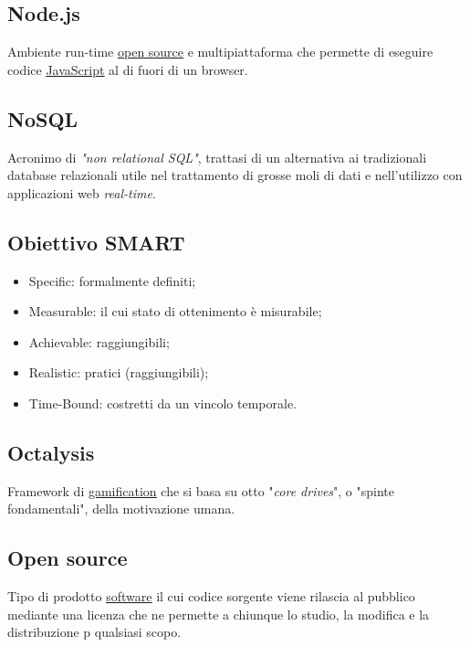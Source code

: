 	\subsection{Node.js}
	\label{sec:nodejs}
	Ambiente run-time \underline{\hyperref[sec:opensource]{open source}} e multipiattaforma che permette di eseguire codice \underline{\hyperref[sec:javascript]{JavaScript}} al di fuori di un browser.

	\subsection{NoSQL}
	\label{sec:nosql}
	Acronimo di \emph{"non relational SQL"}, trattasi di un alternativa ai tradizionali database relazionali utile nel trattamento di grosse moli di dati e nell'utilizzo con applicazioni web \emph{real-time}.
	\newpage


	\subsection{Obiettivo SMART}
	\label{sec:smart}
	\begin{itemize}
			\item Specific: formalmente definiti;
			\item Measurable: il cui stato di ottenimento è misurabile;
			\item Achievable: raggiungibili;
			\item Realistic: pratici (raggiungibili);
			\item Time-Bound: costretti da un vincolo temporale.
		\end{itemize}

	\subsection{Octalysis}
	\label{sec:octalysis}
	Framework di \underline{\hyperref[sec:gamification]{gamification}} che si basa su otto "\emph{core drives}", o "spinte fondamentali", della motivazione umana.

		\subsection{Open source}
		\label{sec:opensource}
		Tipo di prodotto \underline{\hyperref[sec:prodottosoftware]{software}} il cui codice sorgente viene rilascia	al pubblico mediante una licenza che ne permette a chiunque lo studio, la modifica e la distribuzione p	qualsiasi scopo.
		\newpage

